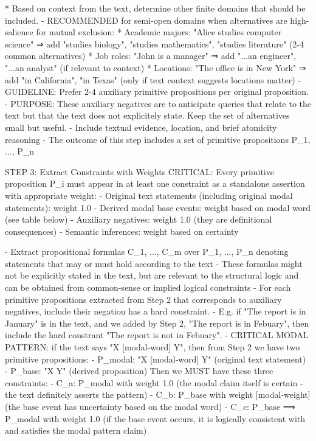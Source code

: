     * Based on context from the text, determine other finite domains that should be included. 
  - RECOMMENDED for semi-open domains when alternatives are high-salience for mutual exclusion:
    * Academic majors: "Alice studies computer science" ⇒ add "studies biology", "studies mathematics", "studies literature" (2-4 common alternatives)
    * Job roles: "John is a manager" ⇒ add "...an engineer", "...an analyst" (if relevant to context)
    * Locations: "The office is in New York" ⇒ add "in California", "in Texas" (only if text context suggests locations matter)
  - GUIDELINE: Prefer 2-4 auxiliary primitive propositions per original proposition. 
  - PURPOSE: These auxiliary negatives are to anticipate queries that relate to the text but that the text does not explicitely state. 
  Keep the set of alternatives small but useful.
- Include textual evidence, location, and brief atomicity reasoning
- The outcome of this step includes a set of primitive propositions {P_1, ..., P_n}

STEP 3: Extract Constraints with Weights
CRITICAL: Every primitive proposition P_i must appear in at least one constraint as a standalone assertion with appropriate weight:
- Original text statements (including original modal statements): weight 1.0
- Derived modal base events: weight based on modal word (see table below)
- Auxiliary negatives: weight 1.0 (they are definitional consequences)
- Semantic inferences: weight based on certainty

- Extract propositional formulas C_1, ..., C_m over {P_1, ..., P_n} denoting statements that may or must hold according to the text
- These formulas might not be explicitly stated in the text, but are relevant to the structural logic and can be obtained from common-sense or implied logical constraints
- For each primitive propositions extracted from Step 2 that corresponds to auxiliary negatives, include their negation has a hard constraint. 
- E.g. if "The report is in January" is in the text, and we added by Step 2, "The report is in Febuary", then include the hard constrant "The report is not in Febuary". 
- CRITICAL MODAL PATTERN: if the text says "X [modal-word] Y", then from Step 2 we have two primitive propositions:
  - P_modal: "X [modal-word] Y" (original text statement)
  - P_base: "X Y" (derived proposition)
  Then we MUST have these three constraints:
  - C_a: P_modal with weight 1.0 (the modal claim itself is certain - the text definitely asserts the pattern)
  - C_b: P_base with weight [modal-weight] (the base event has uncertainty based on the modal word)
  - C_c: P_base ⟹ P_modal with weight 1.0 (if the base event occurs, it is logically consistent with and satisfies the modal pattern claim)
  
